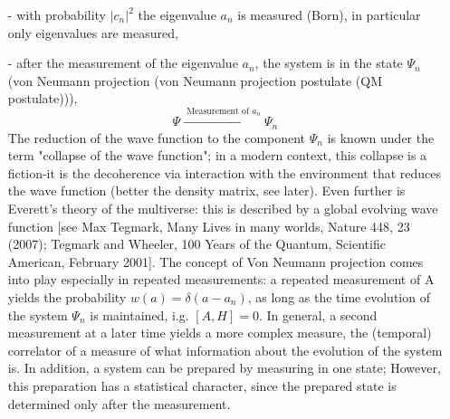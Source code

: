 \begin{itemize}
    \item[-] with probability $| c_n|^2$ the eigenvalue $a_n$ is measured (Born), in particular only eigenvalues ​​are measured,
    \item[-] after the measurement of the eigenvalue $a_n$, the system is in the state $\Psi_n$ (von Neumann projection (von Neumann projection postulate (QM postulate))),
    \begin{equation}
        \Psi \stackrel{\text { Measurement of } a_{n}}{\longrightarrow} \Psi_{n}
    \end{equation}
    The reduction of the wave function to the component $\Psi_n$ is known under the term "collapse of the wave function"; in a modern context, this collapse is a fiction-it is the decoherence via interaction with the environment that reduces the wave function (better the density matrix, see later). Even further is Everett's theory of the multiverse: this is described by a global evolving wave function [see Max Tegmark, Many Lives in many worlds, Nature 448, 23 (2007); Tegmark and Wheeler, 100 Years of the Quantum, Scientific American, February 2001]. The concept of Von Neumann projection comes into play especially in repeated measurements: a repeated measurement of A yields the probability $w (a) =\delta(a-a_n)$, as long as the time evolution of the system $\Psi_n$ is maintained, i.g. $[A, H] = 0$. In general, a second measurement at a later time yields a more complex measure, the (temporal) correlator of a measure of what information about the evolution of the system is. In addition, a system can be prepared by measuring in one state; However, this preparation has a statistical character, since the prepared state is determined only after the measurement.
\end{itemize}


